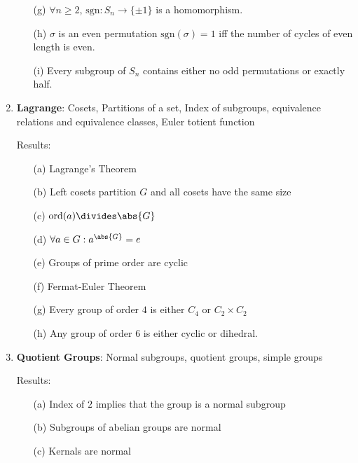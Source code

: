 \documentclass{article}
\begin{document}
\begin{enumerate}
\begin{enumerate}
		\item [(g)] $\forall n \geq 2$, $\text{sgn} : S_{n}\rightarrow \{\pm 1\}$ is a homomorphism.

		\item [(h)] $\sigma$ is an even permutation $\text{sgn}(\sigma) = 1$ iff the number of cycles of even length is even.

		\item [(i)] Every subgroup of $S_{n}$ contains either no odd permutations or exactly half.
	\end{enumerate}

	\item \textbf{Lagrange}: Cosets, Partitions of a set, Index of subgroups, equivalence relations and equivalence classes, Euler totient function

	Results:
	\begin{enumerate}
		\item [(a)] Lagrange's Theorem

		\item [(b)] Left cosets partition $G$ and all cosets have the same size

		\item [(c)] $\text{ord}(a) \divides \abs{G}$

		\item [(d)] $\forall a \in G : a^{\abs{G}} = e$

		\item [(e)] Groups of prime order are cyclic

		\item [(f)] Fermat-Euler Theorem

		\item [(g)] Every group of order $4$ is either $C_{4}$ or $C_{2} \times C_{2}$

		\item [(h)] Any group of order 6 is either cyclic or dihedral.
	\end{enumerate}

	\item \textbf{Quotient Groups}: Normal subgroups, quotient groups, simple groups

	Results:
	\begin{enumerate}
		\item [(a)] Index of $2$ implies that the group is a normal subgroup

		\item [(b)] Subgroups of abelian groups are normal

		\item [(c)] Kernals are normal 
	

\end{enumerate}
\end{enumerate}
\end{document}
